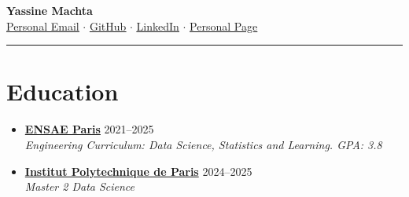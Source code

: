 \documentclass[letterpaper,11pt,twocolumn]{article}
\newcommand{\resumeSubheading}[4]{
	\vspace{-2pt}\item \textbf{#1} \hfill #2 \\
	\textit{\small #3} \hfill \textit{\small #4} 
	\vspace{-7pt}
}
\begin{document}
	
	\begin{center}
		{\LARGE \textbf{Yassine Machta}} \\[5pt]
		\href{mailto:machtayassine@gmail.com}{\underline{Personal Email}} $\cdot$ 
		\href{https://github.com/MachtaYassine}{ \underline{GitHub}} $\cdot$ 
		\href{https://www.linkedin.com/in/yassine-machta-a00307206/}{ \underline{LinkedIn}} $\cdot$ 
		\href{https://machtayassine.github.io}{ \underline{Personal Page}}
	\end{center}
	
	\vspace{-10pt}
	\hrule
	\vspace{-10pt}
	
	\section{Education}
	\begin{itemize}[leftmargin=*]
		\resumeSubheading
		{\href{https://www.ensae.fr/en}{ENSAE Paris}}{2021--2025}
		{Engineering Curriculum: Data Science, Statistics and Learning. GPA: 3.8}{}
		\resumeSubheading
		{\href{https://www.ip-paris.fr/}{Institut Polytechnique de Paris}}{2024--2025}
		{Master 2 Data Science}{}
	\end{itemize}
	
\end{document}
